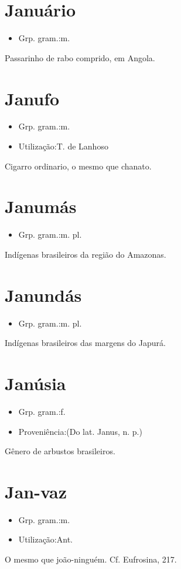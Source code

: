 \documentclass{article}
\begin{document}
\section{Januário}
\begin{itemize}
\item {Grp. gram.:m.}
\end{itemize}
Passarinho de rabo comprido, em Angola.
\section{Janufo}
\begin{itemize}
\item {Grp. gram.:m.}
\end{itemize}
\begin{itemize}
\item {Utilização:T. de Lanhoso}
\end{itemize}
Cigarro ordinario, o mesmo que \textunderscore chanato\textunderscore .
\section{Janumás}
\begin{itemize}
\item {Grp. gram.:m. pl.}
\end{itemize}
Indígenas brasileiros da região do Amazonas.
\section{Janundás}
\begin{itemize}
\item {Grp. gram.:m. pl.}
\end{itemize}
Indígenas brasileiros das margens do Japurá.
\section{Janúsia}
\begin{itemize}
\item {Grp. gram.:f.}
\end{itemize}
\begin{itemize}
\item {Proveniência:(Do lat. \textunderscore Janus\textunderscore , n. p.)}
\end{itemize}
Gênero de arbustos brasileiros.
\section{Jan-vaz}
\begin{itemize}
\item {Grp. gram.:m.}
\end{itemize}
\begin{itemize}
\item {Utilização:Ant.}
\end{itemize}
O mesmo que \textunderscore joão-ninguém\textunderscore . Cf. \textunderscore Eufrosina\textunderscore , 217.
\end{document}
